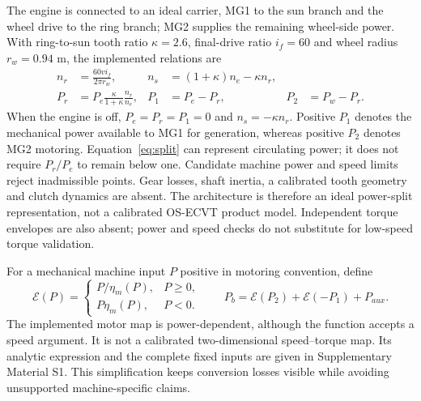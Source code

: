 \documentclass[energies,article,submit,moreauthors]{Definitions/mdpi}
\begin{document}
The engine is connected to an ideal carrier, MG1 to the sun branch and the wheel drive to the ring branch; MG2 supplies the remaining wheel-side power. With ring-to-sun tooth ratio $\kappa=2.6$, final-drive ratio $i_f=60$ and wheel radius $r_w=0.94$ m, the implemented relations are
\begin{align}
 n_r&=\frac{60v i_f}{2\pi r_w},&
 n_s&=(1+\kappa)n_e-\kappa n_r,\label{eq:kinematics}\\
 P_r&=P_e\frac{\kappa}{1+\kappa}\frac{n_r}{n_e},&
 P_1&=P_e-P_r,& P_2&=P_w-P_r.\label{eq:split}
\end{align}
When the engine is off, $P_e=P_r=P_1=0$ and $n_s=-\kappa n_r$. Positive $P_1$ denotes the mechanical power available to MG1 for generation, whereas positive $P_2$ denotes MG2 motoring. Equation~\ref{eq:split} can represent circulating power; it does not require $P_r/P_e$ to remain below one. Candidate machine power and speed limits reject inadmissible points. Gear losses, shaft inertia, a calibrated tooth geometry and clutch dynamics are absent. The architecture is therefore an ideal power-split representation, not a calibrated OS-ECVT product model. Independent torque envelopes are also absent; power and speed checks do not substitute for low-speed torque validation.

For a mechanical machine input $P$ positive in motoring convention, define
\begin{equation}
 \mathcal{E}(P)=\begin{cases}P/\eta_m(P),&P\geq0,\\P\eta_m(P),&P<0.\end{cases}
 \qquad P_b=\mathcal{E}(P_2)+\mathcal{E}(-P_1)+P_{aux}.
\end{equation}
The implemented motor map is power-dependent, although the function accepts a speed argument. It is not a calibrated two-dimensional speed--torque map. Its analytic expression and the complete fixed inputs are given in Supplementary Material S1. This simplification keeps conversion losses visible while avoiding unsupported machine-specific claims.
\end{document}
